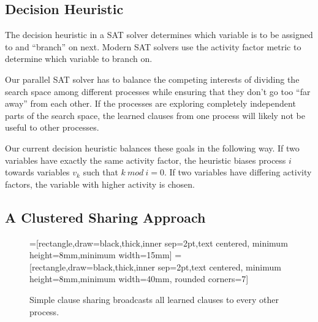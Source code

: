 \documentclass[letterpaper, compsoc, conference]{IEEEtran}
\begin{document}
\subsection{Decision Heuristic} 

The decision heuristic in a SAT solver determines which variable is to be
assigned to and ``branch'' on next. Modern SAT solvers use the activity factor
metric to determine which variable to branch on.

Our parallel SAT solver has to balance the competing interests of dividing the
search space among different processes while ensuring that they don't go too
``far away'' from each other. If the processes are exploring completely
independent parts of the search space, the learned clauses from one process
will likely not be useful to other processes. 

Our current decision heuristic balances these goals in the following way.  If
two variables have exactly the same activity factor, the heuristic biases
process $i$ towards variables $v_k$ such that $k~mod~i=0$. If two variables
have differing activity factors, the variable with higher activity is chosen.

\subsection{A Clustered Sharing Approach}

\begin{figure}[htbp]
    =[rectangle,draw=black,thick,inner sep=2pt,text centered,
                     minimum height=8mm,minimum width=15mm]
    =[rectangle,draw=black,thick,inner sep=2pt,text centered,
                        minimum height=8mm,minimum width=40mm, rounded corners=7]
    \begin{center}
    \end{center}
    \caption{Simple clause sharing broadcasts all learned clauses to every other process.}
    \label{fig:simple}
\end{figure}
\end{document}
